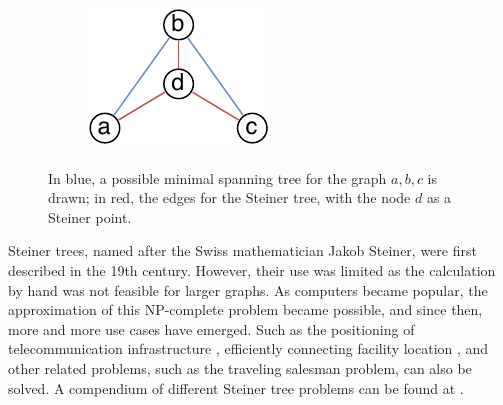 \begin{figure}[t]
    \centering
    \begin{subfigure}{0.35\linewidth}
        \centering
        \includegraphics[width=\linewidth]{figures/spannbaum_steiner.pdf}
    \end{subfigure}
  \caption{In blue, a possible minimal spanning tree for the graph $a, b, c$ is drawn; in red, the edges for the Steiner tree, with the node $d$ as a Steiner point.}
  \label{fig:steiner_tree_example}
\end{figure}

Steiner trees, named after the Swiss mathematician Jakob Steiner, were first described in the 19th century. However, their use was limited as the calculation by hand was not feasible for larger graphs. As computers became popular, the approximation of this NP-complete problem became possible, and since then, more and more use cases have emerged. Such as the positioning of telecommunication infrastructure \cite{voss_steiner_2006}, efficiently connecting facility location \cite{eisenbrand_connected_2010}, and other related problems, such as the traveling salesman problem, can also be solved. A compendium of different Steiner tree problems can be found at \cite{Hauptmann_compendium_2015}.

